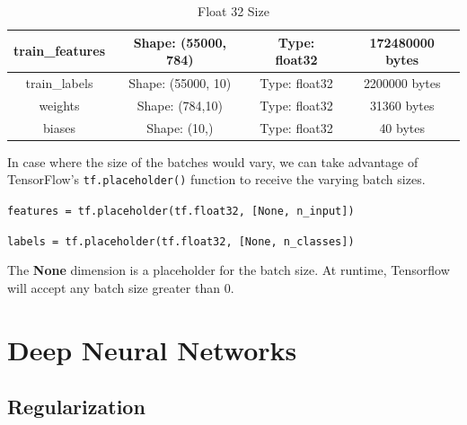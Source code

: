 \documentclass[11pt, a4paper]{article}
\begin{document}
\begin{table}[hbt!]
	\centering
	\caption{Float 32 Size}
	\label{tab:float32_size}
	\begin{tabular}{|c|c|c|c|}
		 \hline
		 train\_features & Shape: (55000, 784) & Type: float32  & 172480000 bytes \\
		 \hline
		 train\_labels   & Shape: (55000, 10)  & Type: float32  & 2200000 bytes \\
		 \hline
		 weights		  & Shape: (784,10)	    & Type: float32  & 31360 bytes \\
		 \hline
		 biases		  & Shape: (10,)		& Type: float32  & 40 bytes  \\
		 \hline
	\end{tabular}
\end{table}

In case where the size of the batches would vary, we can take advantage of TensorFlow's \texttt{tf.placeholder()} function to receive the varying batch sizes. 

\texttt{features = tf.placeholder(tf.float32, [None, n\_input])}

\texttt{labels = tf.placeholder(tf.float32, [None, n\_classes])}


The \textbf{None} dimension is a placeholder for the batch size. At runtime, Tensorflow will accept any batch size greater than 0.

\section{Deep Neural Networks}%
\label{sec:deep_neural_networks}



\subsection{Regularization}%
\label{sub:regularization}
\end{document}
